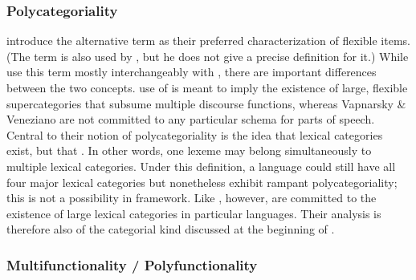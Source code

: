 \subsubsection{Polycategoriality}
\label{sec:2.3.1.2}

\textcite[4]{VapnarskyVeneziano2017a} introduce the alternative term  as their preferred characterization of flexible items. (The term is also used by \textcite{Carter2006}, but he does not give a precise definition for it.) While \citeauthor{VapnarskyVeneziano2017a} use this term mostly interchangeably with , there are important differences between the two concepts.  use of  is meant to imply the existence of large, flexible supercategories that subsume multiple discourse functions, whereas Vapnarsky \& Veneziano are not committed to any particular schema for parts of speech. Central to their notion of polycategoriality is the idea that lexical categories exist, but that . In other words, one lexeme may belong simultaneously to multiple lexical categories. Under this definition, a language could still have all four major lexical categories but nonetheless exhibit rampant polycategoriality; this is not a possibility in  framework. Like \citeauthor{Hengeveld1992}, however, \citeauthor{VapnarskyVeneziano2017a} are committed to the existence of large lexical categories in particular languages. Their analysis is therefore also of the categorial kind discussed at the beginning of .

\subsubsection{Multifunctionality / Polyfunctionality}
\label{sec:2.3.1.3}

